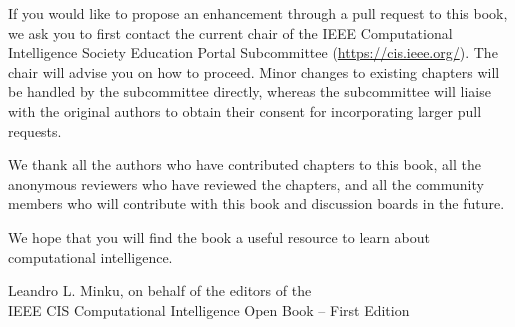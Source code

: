 If you would like to propose an enhancement through a pull request to this book, we ask you to first contact the current chair of the IEEE Computational Intelligence Society Education Portal Subcommittee (\url{https://cis.ieee.org/}). The chair will advise you on how to proceed. Minor changes to existing chapters will be handled by the subcommittee directly, whereas the subcommittee will liaise with the original authors to obtain their consent for incorporating larger pull requests. 

We thank all the authors who have contributed chapters to this book, all the anonymous reviewers who have reviewed the chapters, and all the community members who will contribute with this book and discussion boards in the future.

We hope that you will find the book a useful resource to learn about computational intelligence.

\vspace{\baselineskip}
\begin{flushright}\noindent
Leandro L. Minku, on behalf of the editors of the\\
IEEE CIS Computational Intelligence Open Book -- First Edition 
\end{flushright}


